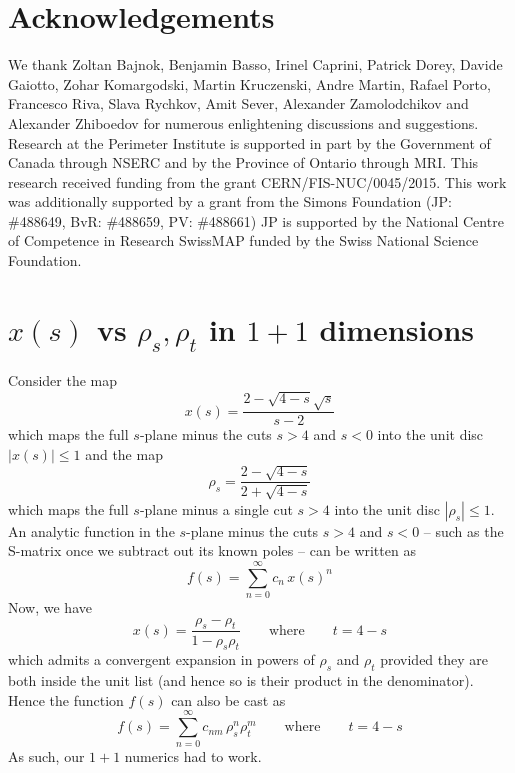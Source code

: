 \documentclass[12pt]{article}
\newcommand{\begBvR}[1]{\begin{#1}}
\newcommand{\beq}{\begBvR{equation}}
\newcommand{\eeq}{\end{equation}}
\newcommand{\la}[1]{\label{#1}}
\newcommand{\<}{{\langle}}
\renewcommand{\>}{{\rangle}}
\begin{document}
\section*{Acknowledgements}

We thank Zoltan Bajnok, Benjamin Basso, Irinel Caprini, Patrick Dorey, Davide Gaiotto, Zohar Komargodski, Martin Kruczenski, Andre Martin, Rafael Porto, Francesco Riva, Slava Rychkov, Amit Sever, Alexander Zamolodchikov and Alexander Zhiboedov for numerous enlightening discussions and suggestions. Research at the Perimeter Institute is supported in part by the Government of Canada through NSERC and by the Province of Ontario through MRI. 
This research received funding from the grant CERN/FIS-NUC/0045/2015.
This work was additionally supported by a grant from the Simons Foundation (JP: \#488649, BvR: \#488659, PV: \#488661)
JP is supported by the National Centre of Competence in Research SwissMAP funded by the
Swiss National Science Foundation.
\newpage
\appendix


\section{\texorpdfstring{$x(s)$ vs $\rho_s,\rho_t$ in $1+1$ dimensions}{x(s) vs rhos, rhot in 1+1 dimensions}} \la{appendixA}
Consider the map $$x(s)=\frac{2-\sqrt{4-s}\sqrt{s}}{s-2}$$ which maps the full $s$-plane minus the cuts $s>4$ and $s<0$ into the unit disc $|x(s)|\le 1$ and the map 
$$\rho_s=\frac{2-\sqrt{4-s}}{2+\sqrt{4-s}} $$
which maps the full $s$-plane minus a single cut $s>4$ into the unit disc $|\rho_s|\le 1$. An analytic function in the $s$-plane minus the cuts $s>4$ and $s<0$ -- such as the S-matrix once we subtract out its known poles -- can be written as 
\beq
f(s)=\sum_{n=0}^\infty c_n \,x(s)^n 
\eeq
Now, we have 
\beq
x(s)=\frac{\rho_s-\rho_t}{1-\rho_s\rho_t}  \qquad \text{where}\qquad  t=4-s
\eeq
which admits a convergent expansion in powers of $\rho_s$ and $\rho_t$ provided they are both inside the unit list (and hence so is their product in the denominator). 
Hence the function $f(s)$ can also be cast as 
\beq
f(s)=\sum_{n=0}^\infty c_{nm} \,\rho_s^n \rho_t^m \qquad \text{where}\qquad  t=4-s
\eeq
As such, our $1+1$ numerics had to work. 
\end{document}
